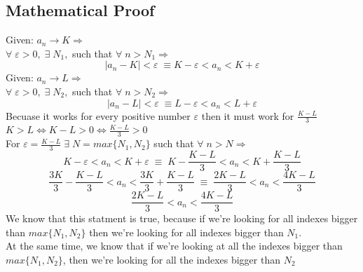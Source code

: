 \subsection{Mathematical Proof}
Given: $a_n\rightarrow K \Longrightarrow$\\
$\forall\; \varepsilon>0,\; \exists\; N_1,$ such that $\forall\;n>N_1\Longrightarrow$
\[
    |a_n-K|<\varepsilon\; \equiv K-\varepsilon<a_n<K+\varepsilon
\]
Given: $a_n\rightarrow L \Longrightarrow$\\
$\forall\; \varepsilon>0,\; \exists\; N_2,$ such that $\forall\;n>N_2\Longrightarrow$
\[
    |a_n-L|<\varepsilon\; \equiv L-\varepsilon<a_n<L+\varepsilon
\]
Becuase it works for every positive number $\varepsilon$ then it must work for $\frac{K-L}{3}$\\
$K>L\iff K-L>0\iff \frac{K-L}{3}>0$\\
For $\varepsilon =\frac{K-L}{3}\;\exists\; N=max\{N_1,N_2\}$ such that $\forall\; n>N\Longrightarrow$
\[
    K-\varepsilon<a_n<K+\varepsilon\; \equiv\; K-\frac{K-L}{3}<a_n<K+\frac{K-L}{3}
\]
\[
    \frac{3K}{3}-\frac{K-L}{3}<a_n<\frac{3K}{3}+\frac{K-L}{3}\; \equiv\; \frac{2K-L}{3}<a_n<\frac{4K-L}{3}
\]
\[
    \frac{2K-L}{3}<a_n<\frac{4K-L}{3}
\]
We know that this statment is true, because if we're looking for all indexes bigger than $max\{N_1,N_2\}$ then we're looking for all indexes bigger than $N_1$.\\
At the same time, we know that if we're looking at all the indexes bigger than $max\{N_1,N_2\}$, then we're looking for all the indexes bigger than $N_2$